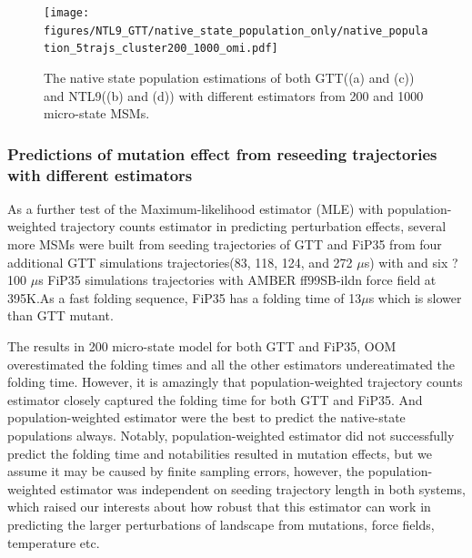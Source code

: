 \documentclass[%
 aip,
rsi,%
 amsmath,amssymb,
 reprint,%
]{revtex4-1}
\begin{document}
\begin{figure}
\texttt{[image: figures/NTL9\_GTT/native\_state\_population\_only/native\_population\_5trajs\_cluster200\_1000\_omi.pdf]}%
\caption{The native state population estimations of both GTT((a) and (c)) and NTL9((b) and (d)) with different estimators from 200 and 1000 micro-state MSMs.}
\end{figure}


\subsubsection{Predictions of mutation effect from reseeding trajectories with different estimators}

As a further test of the Maximum-likelihood estimator (MLE) with population-weighted trajectory counts estimator in predicting perturbation effects, several more MSMs were built from seeding trajectories of GTT and FiP35 from four additional GTT simulations trajectories(83, 118, 124, and 272 $\mu$s)\cite{HoubiNguyen:2005ec,Piana:2011gma} with and six ?100 $\mu$s FiP35 simulations trajectories with AMBER ff99SB-ildn force field at 395K\cite{Shaw:2010ge,Piana:2011gma}.As a fast folding sequence, FiP35 has a folding time of 13$\mu$s which is slower than GTT mutant\cite{Nguyen:2005ec}. 

The results in 200 micro-state model for both GTT and FiP35, OOM overestimated the folding times and all the other estimators undereatimated the folding time. However, it is amazingly that population-weighted trajectory counts estimator closely captured the folding time for both GTT and FiP35. And population-weighted estimator were the best to predict the native-state populations always. Notably, population-weighted estimator did not successfully predict the folding time and notabilities resulted in mutation effects, but we assume it may be caused by finite sampling errors, however, the population-weighted estimator was independent on seeding trajectory length in both systems, which raised our interests about how robust that this estimator can work in predicting  the larger perturbations of landscape from mutations, force fields, temperature etc.
\end{document}
